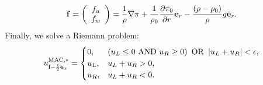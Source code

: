 \documentclass[11pt]{article}
\def\half  {\frac{1}{2}}
\def\mac   {\rm MAC}
\def\eb    {{\bf e}}
\def\fb    {{\bf f}}
\def\ib    {{\bf i}}
\begin{document}
\begin{equation}
\fb =
\left(\begin{array}{c}
f_u \\
f_w \\
\end{array}\right)
= \frac{1}{\rho}\nabla\pi + \frac{1}{\rho_0}\frac{\partial\pi_0}{\partial r}\eb_r - \frac{(\rho-\rho_0)}{\rho}g\eb_r.
\end{equation}
Finally, we solve a Riemann problem:
\begin{equation}
u_{\ib-\half\eb_x}^{\mac,*} =
\begin{cases}
0, & \left(u_L \le 0 ~ {\rm AND} ~ u_R \ge 0\right) ~ {\rm OR} ~ \left|u_L + u_R\right| < \epsilon, \\
u_L, & u_L + u_R > 0, \\
u_R, & u_L + u_R < 0. 
\end{cases}
\end{equation}
\end{document}

